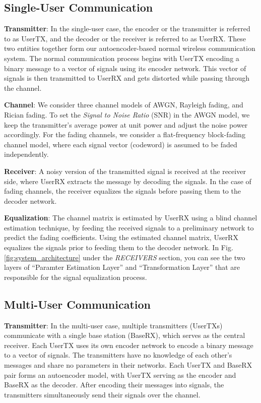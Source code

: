 \subsection{Single-User Communication}
\textbf{Transmitter}: In the single-user case, the encoder or the transmitter is referred to as UserTX, and the decoder or the receiver is referred to as UserRX. These two entities together form our autoencoder-based normal wireless communication system. The normal communication process begins with UserTX encoding a binary message to a vector of signals using its encoder network. This vector of signals is then transmitted to UserRX and gets distorted while passing through the channel.

\textbf{Channel}: We consider three channel models of AWGN, Rayleigh fading, and Rician fading. To set the \textit{Signal to Noise Ratio} (SNR) in the AWGN model, we keep the transmitter's average power at unit power and adjust the noise power accordingly. For the fading channels, we consider a flat-frequency block-fading channel model, where each signal vector (codeword) is assumed to be faded independently.

\textbf{Receiver}: A noisy version of the transmitted signal is received at the receiver side, where UserRX extracts the message by decoding the signals. In the case of fading channels, the receiver equalizes the signals before passing them to the decoder network.

\textbf{Equalization}: The channel matrix is estimated by UserRX using a blind channel estimation technique, by feeding the received signals to a preliminary network to predict the fading coefficients. Using the estimated channel matrix, UserRX equalizes the signals prior to feeding them to the decoder network. In Fig. \ref{fig:system_architecture} under the \textit{RECEIVERS} section, you can see the two layers of ``Paramter Estimation Layer'' and ``Transformation Layer'' that are responsible for the signal equalization process.

\subsection{Multi-User Communication}
\textbf{Transmitter}: In the multi-user case, multiple transmitters (UserTXs) communicate with a single base station (BaseRX), which serves as the central receiver. Each UserTX uses its own encoder network to encode a binary message to a vector of signals. The transmitters have no knowledge of each other's messages and share no parameters in their networks. Each UserTX and BaseRX pair forms an autoencoder model, with UserTX serving as the encoder and BaseRX as the decoder. After encoding their messages into signals, the transmitters simultaneously send their signals over the channel.

